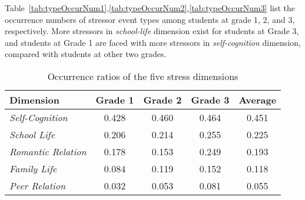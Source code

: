 Table~\ref{tab:typeOccurNum1},\ref{tab:typeOccurNum2},\ref{tab:typeOccurNum3}
list the occurrence numbers of stressor event types among students at grade 1, 2, and 3, respectively.
More stressors in \emph{school-life} dimension exist for students at Grade 3,
and students at Grade 1 are faced with more stressors in \emph{self-cognition} dimension, compared with students at other two grades.	

\begin{table}
\begin{center}
\caption{Occurrence ratios of the five stress dimensions}
\begin{tabular}{|l|c|c|c|c|} \hline
\textbf{Dimension} & \textbf{Grade 1} &  \textbf{Grade 2} & \textbf{Grade 3}  & \textbf{Average} \\ \hline
\emph{Self-Cognition}    & 0.428& 0.460&  0.464& 0.451\\ \hline
\emph{School Life}       & 0.206& 0.214&  0.255& 0.225\\ \hline
\emph{Romantic Relation} & 0.178& 0.153&  0.249& 0.193\\ \hline
\emph{Family Life}       & 0.084& 0.119&  0.152& 0.118\\ \hline
\emph{Peer Relation}     & 0.032& 0.053&  0.081& 0.055\\ \hline
\end{tabular}
\label{tab:dimensionOccurRate}
\end{center}
\end{table}

